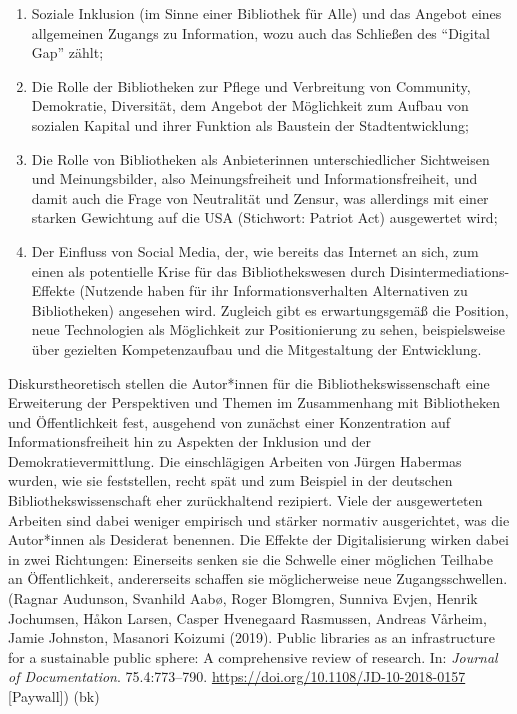 \documentclass[a4paper,
fontsize=11pt,
oneside,
numbers=noperiodatend,
parskip=half-,
bibliography=totoc,
final
]{scrartcl}
\begin{document}
\begin{enumerate}
\def\labelenumi{\arabic{enumi}.}
\item
  Soziale Inklusion (im Sinne einer Bibliothek für Alle) und das Angebot
  eines allgemeinen Zugangs zu Information, wozu auch das Schließen des
  \enquote{Digital Gap} zählt;
\item
  Die Rolle der Bibliotheken zur Pflege und Verbreitung von Community,
  Demokratie, Diversität, dem Angebot der Möglichkeit zum Aufbau von
  sozialen Kapital und ihrer Funktion als Baustein der Stadtentwicklung;
\item
  Die Rolle von Bibliotheken als Anbieterinnen unterschiedlicher
  Sichtweisen und Meinungsbilder, also Meinungsfreiheit und
  Informationsfreiheit, und damit auch die Frage von Neutralität und
  Zensur, was allerdings mit einer starken Gewichtung auf die USA
  (Stichwort: Patriot Act) ausgewertet wird;
\item
  Der Einfluss von Social Media, der, wie bereits das Internet an sich,
  zum einen als potentielle Krise für das Bibliothekswesen durch
  Disintermediations-Effekte (Nutzende haben für ihr
  Informationsverhalten Alternativen zu Bibliotheken) angesehen wird.
  Zugleich gibt es erwartungsgemäß die Position, neue Technologien als
  Möglichkeit zur Positionierung zu sehen, beispielsweise über gezielten
  Kompetenzaufbau und die Mitgestaltung der Entwicklung.
\end{enumerate}

Diskurstheoretisch stellen die Autor*innen für die
Bibliothekswissenschaft eine Erweiterung der Perspektiven und Themen im
Zusammenhang mit Bibliotheken und Öffentlichkeit fest, ausgehend von
zunächst einer Konzentration auf Informationsfreiheit hin zu Aspekten
der Inklusion und der Demokratievermittlung. Die einschlägigen Arbeiten
von Jürgen Habermas wurden, wie sie feststellen, recht spät und zum
Beispiel in der deutschen Bibliothekswissenschaft eher zurückhaltend
rezipiert. Viele der ausgewerteten Arbeiten sind dabei weniger empirisch
und stärker normativ ausgerichtet, was die Autor*innen als Desiderat
benennen. Die Effekte der Digitalisierung wirken dabei in zwei
Richtungen: Einerseits senken sie die Schwelle einer möglichen Teilhabe
an Öffentlichkeit, andererseits schaffen sie möglicherweise neue
Zugangsschwellen. (Ragnar Audunson, Svanhild Aabø, Roger Blomgren,
Sunniva Evjen, Henrik Jochumsen, Håkon Larsen, Casper Hvenegaard
Rasmussen, Andreas Vårheim, Jamie Johnston, Masanori Koizumi (2019).
Public libraries as an infrastructure for a sustainable public sphere: A
comprehensive review of research. In: \emph{Journal of Documentation}.
75.4:773--790. \url{https://doi.org/10.1108/JD-10-2018-0157}
{[}Paywall{]}) (bk)
\end{document}
